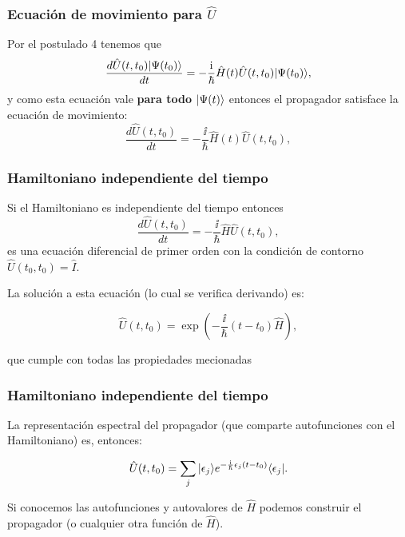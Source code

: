 \documentclass{beamer}
\begin{document}
\begin{frame}
    \frametitle{Ecuación de movimiento para $\hat{U}$}

    Por el postulado 4 tenemos que
    \[\frac{d \hat{U}(t,t_0)| \Psi(t_0) \rangle}{dt} = -\frac{\mathrm{i}}{\hbar} \hat{H}(t) \hat{U}(t,t_0)| \Psi(t_0) \rangle,\]
    y como esta ecuación vale {\bf para todo} $| \Psi(t) \rangle$ entonces el propagador satisface la ecuación de movimiento:
    \[\frac{d \hat{U}(t,t_0)}{dt} = -\frac{\ii}{\hbar} \hat{H}(t) \hat{U}(t,t_0),\]

\end{frame}

\begin{frame}
    \frametitle{Hamiltoniano independiente del tiempo}

    Si el Hamiltoniano es independiente del tiempo entonces
    \[\frac{d \hat{U}(t,t_0)}{dt} = -\frac{\ii}{\hbar} \hat{H} \hat{U}(t,t_0),\]
    es una ecuación diferencial de primer orden con la condición de contorno $\hat{U}(t_0,t_0)=\hat{I}$.

    La solución a esta ecuación (lo cual se verifica derivando) es:

    \[ \hat{U}(t,t_0) = \exp \left( -\frac{\ii}{\hbar}(t-t_0)\hat{H} \right), \]

    que cumple con todas las propiedades mecionadas%


\end{frame}


\begin{frame}
    \frametitle{Hamiltoniano independiente del tiempo}

    La representación espectral del propagador (que comparte autofunciones con el Hamiltoniano) es, entonces:

    \[ \hat{U}(t,t_0)=\sum_j | \epsilon_j \rangle e^{-\frac{\mathrm{i}}{\hbar}\epsilon_j(t-t_0)}\langle \epsilon_j | .\]

    Si conocemos las autofunciones y autovalores de $\hat{H}$ podemos construir el propagador (o cualquier otra función de $\hat{H}$).

\end{frame}
\end{document}
